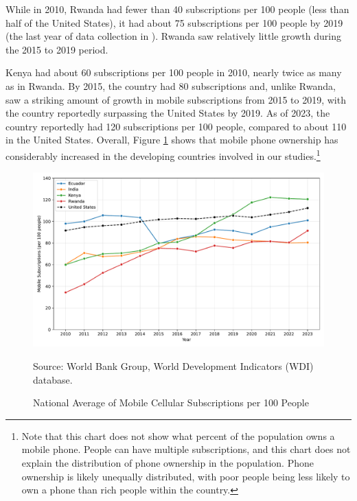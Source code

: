 \documentclass[12pt]{article}
\begin{document}
While in 2010, Rwanda had fewer than 40 subscriptions per 100 people (less than half of the United States), it had about 75 subscriptions per 100 people by 2019 (the last year of data collection in \textcite{fabregas_digital_2025}). Rwanda saw relatively little growth during the 2015 to 2019 period.

Kenya had about 60 subscriptions per 100 people in 2010, nearly twice as many as in Rwanda. By 2015, the country had 80 subscriptions and, unlike Rwanda, saw a striking amount of growth in mobile subscriptions from 2015 to 2019, with the country reportedly surpassing the United States by 2019. As of 2023, the country reportedly had 120 subscriptions per 100 people, compared to about 110 in the United States. Overall, Figure \ref{fig:mobile_subscriptions} shows that mobile phone ownership has considerably increased in the developing countries involved in our studies.\footnote{Note that this chart does not show what percent of the population owns a mobile phone. People can have multiple subscriptions, and this chart does not explain the distribution of phone ownership in the population. Phone ownership is likely unequally distributed, with poor people being less likely to own a phone than rich people within the country.}
\begin{figure}[H]
    \centering
    \caption{National Average of Mobile Cellular Subscriptions per 100 People}
    \includegraphics[width=\textwidth]{../output/mobile_subscriptions.pdf}
    \begin{minipage}{0.9\textwidth}
    \footnotesize
    Source: World Bank Group, World Development Indicators (WDI) database. 
    \end{minipage}
    \label{fig:mobile_subscriptions}
\end{figure}
\end{document}
